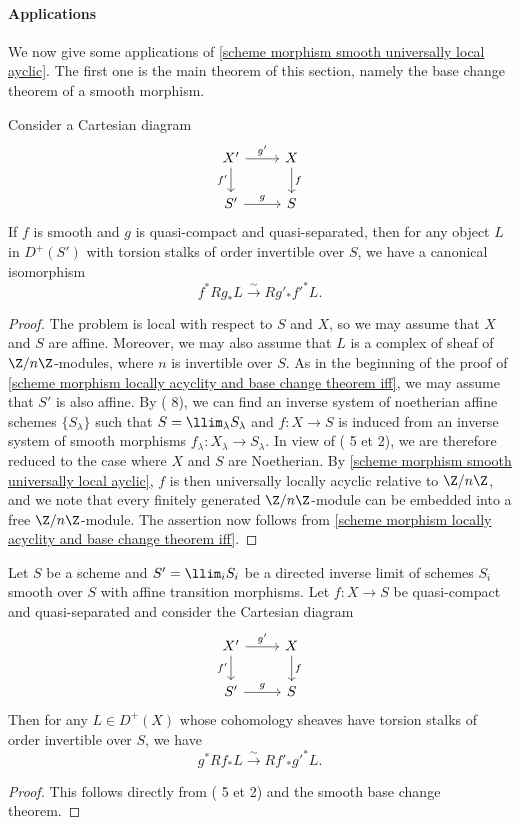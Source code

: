 \paragraph{Applications}
We now give some applications of \cref{scheme morphism smooth universally local ayclic}. The first one is the main theorem of this section, namely the base change theorem of a smooth morphism.

\begin{theorem}
Consider a Cartesian diagram
\[\begin{tikzcd}
X'\ar[r,"g'"]\ar[d,swap,"f'"]&X\ar[d,"f"]\\
S'\ar[r,"g"]&S
\end{tikzcd}\]
If $f$ is smooth and $g$ is quasi-compact and quasi-separated, then for any object $L$ in $D^+(S')$ with torsion stalks of order invertible over $S$, we have a canonical isomorphism
\[f^*Rg_*L\stackrel{\sim}{\to} Rg'_*f'^*L.\]
\end{theorem}
\begin{proof}
The problem is local with respect to $S$ and $X$, so we may assume that $X$ and $S$ are affine. Moreover, we may also assume that $L$ is a complex of sheaf of $\Z/n\Z$-modules, where $n$ is invertible over $S$. As in the beginning of the proof of \cref{scheme morphism locally acyclity and base change theorem iff}, we may assume that $S'$ is also affine. By (\cite{EGA4-3} 8), we can find an inverse system of noetherian affine schemes $\{S_\lambda\}$ such that $S=\llim_\lambda S_\lambda$ and $f:X\to S$ is induced from an inverse system of smooth morphisms $f_\lambda:X_\lambda\to S_\lambda$. In view of (\cite{SGA4-2}  5 et  2), we are therefore reduced to the case where $X$ and $S$ are Noetherian. By \cref{scheme morphism smooth universally local ayclic}, $f$ is then universally locally acyclic relative to $\Z/n\Z$, and we note that every finitely generated $\Z/n\Z$-module can be embedded into a free $\Z/n\Z$-module. The assertion now follows from \cref{scheme morphism locally acyclity and base change theorem iff}.
\end{proof}

\begin{corollary}\label{scheme direct limit of smooth scheme base change}
Let $S$ be a scheme and $S'=\llim_iS_i$ be a directed inverse limit of schemes $S_i$ smooth over $S$ with affine transition morphisms. Let $f:X\to S$ be quasi-compact and quasi-separated and consider the Cartesian diagram
\[\begin{tikzcd}
X'\ar[r,"g'"]\ar[d,swap,"f'"]&X\ar[d,"f"]\\
S'\ar[r,"g"]&S
\end{tikzcd}\]
Then for any $L\in D^+(X)$ whose cohomology sheaves have torsion stalks of order invertible over $S$, we have
\[g^*Rf_*L\stackrel{\sim}{\to} Rf'_*g'^*L.\]
\end{corollary}
\begin{proof}
This follows directly from (\cite{SGA4-2}  5 et  2) and the smooth base change theorem.
\end{proof}

